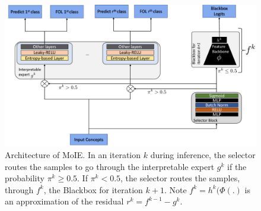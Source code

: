 \begin{figure}[h]
\centering
\includegraphics[width=1\textwidth]
{figures/Supp/Architecture.pdf}
\caption{Architecture of MoIE. In an iteration $k$ during inference, the selector routes the samples to go through the interpretable expert $g^k$ if the probability $\pi^k \ge 0.5$. If $\pi^k < 0.5$, the selector routes the samples, through $f^k$, the Blackbox for iteration $k+1$. Note $f^k = h^k(\Phi(.)$ is an approximation of the residual $r^k = f^{k-1} - g^k$.  }
\label{fig:architecture}
\end{figure}

